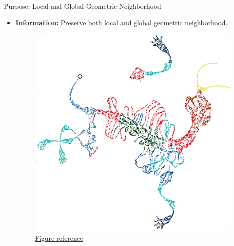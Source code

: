 \documentclass[serif, aspectratio=169]{beamer}
\begin{document}
\begin{frame}{Purpose: Local and Global Geometric Neighborhood}
    \begin{itemize}
        \item \textbf{Information:} Preserve both local and global geometric neighborhood.
        \begin{figure}[htpb]
                \begin{center}
                    \includegraphics[keepaspectratio, scale=0.45]{pic/global_relation.PNG}
                  \caption{\href{https://pair-code.github.io/understanding-umap/#:~:text=The}{Figure reference}}
                \end{center}
        \end{figure}
    \end{itemize}
\end{frame}

\end{document}
